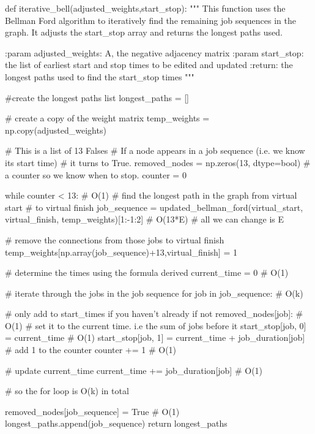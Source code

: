 \documentclass[paper=a4, fontsize=12pt]{scrartcl} %
\numberwithin{equation}{section}       %
\numberwithin{figure}{section}         %
\numberwithin{table}{section}          %
\begin{document}
\begin{python}
def iterative_bell(adjusted_weights,start_stop):
    """
    This function uses the Bellman Ford algorithm to iteratively find
    the remaining job sequences in the graph. It adjusts the start_stop 
    array and returns the longest paths used.

    :param adjusted_weights: A, the negative adjacency matrix
    :param start_stop: the list of earliest start and stop times to be
    edited and updated
    :return: the longest paths used to find the start_stop times
    """
    
    #create the longest paths list
    longest_paths = []
    
    # create a copy of the weight matrix
    temp_weights = np.copy(adjusted_weights)

    # This is a list of 13 Falses
    # If a node appears in a job sequence (i.e. we know its start time)
    # it turns to True.
    removed_nodes = np.zeros(13, dtype=bool)
    # a counter so we know when to stop.
    counter = 0

    while counter < 13:  # O(1)
        # find the longest path in the graph from virtual start
        # to virtual finish
        job_sequence = updated_bellman_ford(virtual_start,
                                            virtual_finish,
                                            temp_weights)[1:-1:2]
        # O(13*E) # all we can change is E


        # remove the connections from those jobs to virtual finish
        temp_weights[np.array(job_sequence)+13,virtual_finish] = 1

        # determine the times using the formula derived
        current_time = 0  # O(1)

        # iterate through the jobs in the job sequence
        for job in job_sequence:  # O(k)

            # only add to start_times if you haven't already
            if not removed_nodes[job]:  # O(1)
                # set it to the current time. i.e the sum of jobs before it
                start_stop[job, 0] = current_time  # O(1)
                start_stop[job, 1] = current_time + job_duration[job]
                # add 1 to the counter
                counter += 1  # O(1)

            # update current_time
            current_time += job_duration[job]  # O(1)

        # so the for loop is O(k) in total

        removed_nodes[job_sequence] = True  # O(1)
        longest_paths.append(job_sequence)
        return longest_paths
\end{python}
\end{document}
